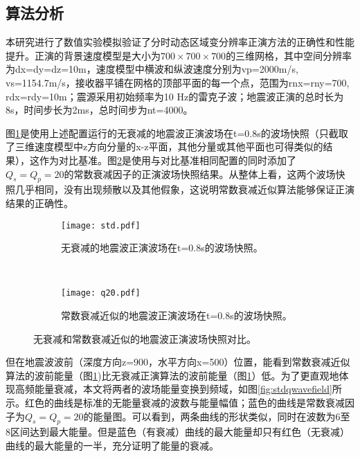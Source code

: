 \subsection{算法分析} %

本研究进行了数值实验模拟验证了分时动态区域变分辨率正演方法的正确性和性能提升。正演的背景速度模型是大小为$700\times700\times700$的三维网格，其中空间分辨率为dx=dy=dz=10m，速度模型中横波和纵波速度分别为vp=2000m/s, vs=1154.7m/s，接收器平铺在网格的顶部平面的每一个点，范围为rnx=rny=700, rdx=rdy=10m；震源采用初始频率为10 Hz的雷克子波；地震波正演的总时长为8s，时间步长为2ms，总时间步为nt=4000。

图\ref{fig:无衰减的地震波正演波场在t=0.8s的波场快照。}是使用上述配置运行的无衰减的地震波正演波场在t=0.8s的波场快照（只截取了三维速度模型中z方向分量的x-z平面，其他分量或其他平面也可得类似的结果），这作为对比基准。图\ref{fig:常数衰减近似的地震波正演波场在t=0.8s的波场快照。}是使用与对比基准相同配置的同时添加了$Q_s=Q_p=20$的常数衰减因子的正演波场快照结果。从整体上看，这两个波场快照几乎相同，没有出现频散以及其他假象，这说明常数衰减近似算法能够保证正演结果的正确性。

\begin{figure}[ht]
    \centering
    \begin{subfigure}[b]{0.5\textwidth}
        \centering
        \texttt{[image: std.pdf]}
        \caption{无衰减的地震波正演波场在t=0.8s的波场快照。}
        \label{fig:无衰减的地震波正演波场在t=0.8s的波场快照。}
    \end{subfigure}%
    ~
    \begin{subfigure}[b]{0.5\textwidth}
        \centering
        \texttt{[image: q20.pdf]}
        \caption{常数衰减近似的地震波正演波场在t=0.8s的波场快照。}
        \label{fig:常数衰减近似的地震波正演波场在t=0.8s的波场快照。}
    \end{subfigure}
    \caption{无衰减和常数衰减近似的地震波正演波场快照对比。}
    \label{fig:qwavefield}
\end{figure}

但在地震波波前（深度方向z=900，水平方向x=500）位置，能看到常数衰减近似算法的波前能量（图\ref{fig:无衰减的地震波正演波场在t=0.8s的波场快照。})比无衰减正演算法的波前能量（图\ref{fig:无衰减的地震波正演波场在t=0.8s的波场快照。}）低。为了更直观地体现高频能量衰减，本文将两者的波场能量变换到频域，如图\ref{fig:stdqwavefield}所示。红色的曲线是标准的无能量衰减的波数与能量幅值；蓝色的曲线是常数衰减因子为$Q_s=Q_p=20$的能量图。可以看到，两条曲线的形状类似，同时在波数为6至8区间达到最大能量。但是蓝色（有衰减）曲线的最大能量却只有红色（无衰减）曲线的最大能量的一半，充分证明了能量的衰减。

